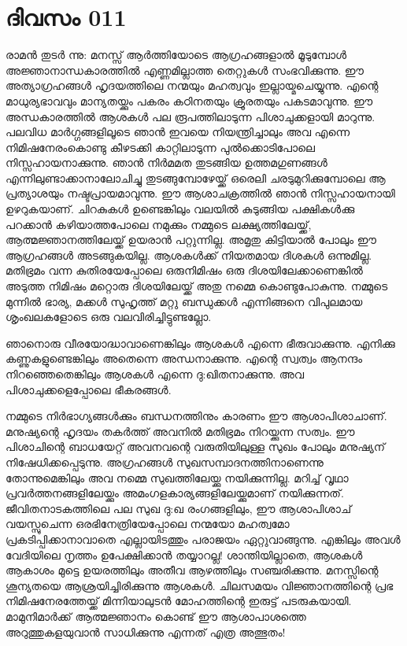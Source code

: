 \newpage
\section{ദിവസം 011}


രാമന്‍ തുടര്‍ ന്നു: മനസ്സ്‌ ആര്‍ത്തിയോടെ ആഗ്രഹങ്ങളാല്‍ മൂടുമ്പോള്‍ അജ്ഞാനാന്ധകാരത്തില്‍ എണ്ണമില്ലാത്ത തെറ്റുകള്‍ സംഭവിക്കുന്നു. ഈ അത്യാഗ്രഹങ്ങള്‍ ഹൃദയത്തിലെ നന്മയും മഹത്വവും ഇല്ലായ്മചെയ്യുന്നു. എന്റെ മാധുര്യഭാവവും മാന്യതയ്ക്കും പകരം കഠിനതയും ക്രൂരതയും പകടമാവുന്നു. ഈ അന്ധകാരത്തില്‍ ആശകള്‍ പല രൂപത്തിലാടുന്ന പിശാചുക്കളായി മാറുന്നു. പലവിധ മാര്‍ഗ്ഗങ്ങളിലൂടെ ഞാന്‍ ഇവയെ നിയന്ത്രിച്ചാലും അവ എന്നെ നിമിഷനേരംകൊണ്ടു കീഴടക്കി കാറ്റിലാടുന്ന പുല്‍ക്കൊടിപോലെ നിസ്സഹായനാക്കുന്നു. ഞാന്‍ നിര്‍മമത തുടങ്ങിയ ഉത്തമഗുണങ്ങള്‍ എന്നിലുണ്ടാക്കാനാലോചിച്ചു തുടങ്ങുമ്പോഴേയ്ക്ക്‌ ഒരെലി ചരടുമുറിക്കുമ്പോലെ ആ പ്രത്യാശയും നഷ്ടപ്രായമാവുന്നു. ഈ ആശാചക്രത്തില്‍ ഞാന്‍ നിസ്സഹായനായി ഉഴറുകയാണ്‌. ചിറകുകള്‍ ഉണ്ടെങ്കിലും വലയില്‍ കുടുങ്ങിയ പക്ഷികള്‍ക്കു പറക്കാന്‍ കഴിയാത്തപോലെ നമുക്കും നമ്മുടെ ലക്ഷ്യത്തിലേയ്ക്ക്, ആത്മജ്ഞാനത്തിലേയ്ക്ക്‌ ഉയരാന്‍ പറ്റുന്നില്ല. അമൃതു കിട്ടിയാല്‍ പോലും ഈ ആഗ്രഹങ്ങള്‍ അടങ്ങുകയില്ല. ആശകള്‍ക്ക്‌ നിയതമായ ദിശകള്‍ ഒന്നുമില്ല. മതിഭ്രമം വന്ന കുതിരയേപ്പോലെ ഒരുനിമിഷം ഒരു ദിശയിലേക്കാണെങ്കില്‍ അടുത്ത നിമിഷം മറ്റൊരു ദിശയിലേയ്ക്ക്‌ അതു നമ്മെ കൊണ്ടുപോകുന്നു. നമ്മുടെ മുന്നില്‍ ഭാര്യ, മക്കള്‍ സുഹൃത്ത്‌ മറ്റു ബന്ധുക്കള്‍ എന്നിങ്ങനെ വിപുലമായ ശൃംഖലകളോടെ ഒരു വലവിരിച്ചിട്ടുണ്ടല്ലോ.

ഞാനൊരു വീരയോദ്ധാവാണെങ്കിലും ആശകള്‍ എന്നെ ഭീരുവാക്കുന്നു.
എനിക്കു കണ്ണുകളുണ്ടെങ്കിലും അതെന്നെ അന്ധനാക്കുന്നു.
എന്റെ സ്വത്വം ആനന്ദം നിറഞ്ഞെതെങ്കിലും ആശകള്‍ എന്നെ ദു:ഖിതനാക്കുന്നു.
അവ പിശാചുക്കളെപ്പോലെ ഭീകരങ്ങള്‍. 

നമ്മുടെ നിര്‍ഭാഗ്യങ്ങള്‍ക്കും ബന്ധനത്തിനും കാരണം ഈ ആശാപിശാചാണ്‌. മനുഷ്യന്റെ ഹൃദയം തകര്‍ത്ത്‌ അവനില്‍ മതിഭ്രമം നിറയ്ക്കുന്ന സത്വം. ഈ പിശാചിന്റെ ബാധയേറ്റ്‌ അവനവന്റെ വരുതിയിലുള്ള സുഖം പോലും മനുഷ്യന്‌ നിഷേധിക്കപ്പെടുന്നു. അഗ്രഹങ്ങള്‍ സുഖസമ്പാദനത്തിനാണെന്നു തോന്നുമെങ്കിലും അവ നമ്മെ സുഖത്തിലേയ്ക്കു നയിക്കുന്നില്ല. മറിച്ച്‌ വൃഥാ പ്രവര്‍ത്തനങ്ങളിലേയ്ക്കും അമംഗളകാര്യങ്ങളിലേയ്ക്കുമാണ്‌ നയിക്കുന്നത്‌. ജീവിതനാടകത്തിലെ പല സുഖ ദു:ഖ രംഗങ്ങളിലും, ഈ ആശാപിശാച്‌ വയസ്സുചെന്ന ഒരഭിനേത്രിയേപ്പോലെ നന്മയോ മഹത്വമോ പ്രകടിപ്പിക്കാനാവാതെ എല്ലായിടത്തും പരാജയം ഏറ്റുവാങ്ങുന്നു. എങ്കിലും അവള്‍ വേദിയിലെ നൃത്തം ഉപേക്ഷിക്കാന്‍ തയ്യാറല്ല! ശാന്തിയില്ലാതെ, ആശകള്‍ ആകാശം മുട്ടെ ഉയരത്തിലും അതീവ ആഴത്തിലും സഞ്ചരിക്കുന്നു. മനസ്സിന്റെ ശൂന്യതയെ ആശ്രയിച്ചിരിക്കുന്നു ആശകള്‍. ചിലസമയം വിജ്ഞാനത്തിന്റെ പ്രഭ നിമിഷനേരത്തേയ്ക്ക്‌ മിന്നിയാലുടന്‍ മോഹത്തിന്റെ ഇരുട്ട്‌ പടരുകയായി. മാമുനിമാര്‍ക്ക്‌ ആത്മജ്ഞാനം കൊണ്ട്‌ ഈ ആശാപാശത്തെ അറുത്തുകളയുവാന്‍ സാധിക്കുന്നു എന്നത്‌ എത്ര അത്ഭുതം!

